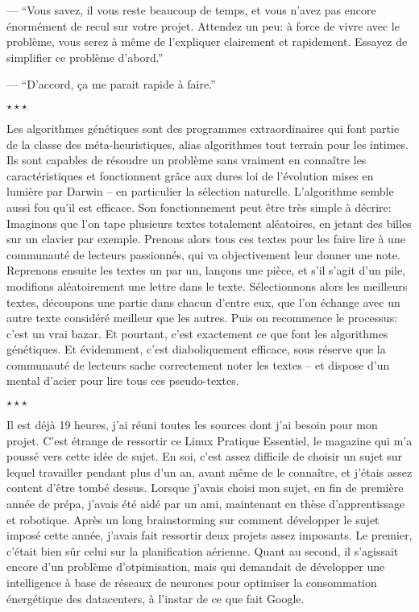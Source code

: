 \documentclass[letterpaper, 12pt]{article} %
\newcommand{\stardelimiter}{{\begin{center}\vspace{0.5cm} $\star \star \star$\vspace{0.58cm}\end{center}}}
\begin{document}
{--- ``Vous savez, il vous reste beaucoup de temps, et vous n'avez pas encore énormément de recul sur votre projet.
		Attendez un peu: à force de vivre avec le problème, vous serez à même de l'expliquer clairement et rapidement.
		Essayez de simplifier ce problème d'abord.''

--- ``D'accord, ça me parait rapide à faire.''

\stardelimiter{}

Les algorithmes génétiques sont des programmes extraordinaires qui font partie de la classe des méta-heuristiques, alias algorithmes tout terrain pour les intimes. 
Ils sont capables de résoudre un problème sans vraiment en connaître les caractéristiques et fonctionnent grâce aux dures loi de l'évolution mises en lumière par Darwin -- en particulier la sélection naturelle. 
L'algorithme semble aussi fou qu'il est efficace.
Son fonctionnement peut être très simple à décrire: 
Imaginons que l'on tape plusieurs textes totalement aléatoires, en jetant des billes sur un clavier par exemple.
Prenons alors tous ces textes pour les faire lire à une communauté de lecteurs passionnés, qui va objectivement leur donner une note.
Reprenons ensuite les textes un par un, lançons une pièce, et s'il s'agit d'un pile, modifions aléatoirement une lettre dans le texte.
Sélectionnons alors les meilleurs textes, découpons une partie dans chacun d'entre eux, que l'on échange avec un autre texte considéré meilleur que les autres.
Puis on recommence le processus: c'est un vrai bazar. 
Et pourtant, c'est exactement ce que font les algorithmes génétiques.
Et évidemment, c'est diaboliquement efficace, sous réserve que la communauté de lecteurs sache correctement noter les textes -- et dispose d'un mental d'acier pour lire tous ces pseudo-textes.

\stardelimiter{}

Il est déjà 19 heures, j'ai réuni toutes les sources dont j'ai besoin pour mon projet. 
C'est étrange de ressortir ce Linux Pratique Essentiel, le magazine qui m'a poussé vers cette idée de sujet. 
En soi, c'est assez difficile de choisir un sujet sur lequel travailler pendant plus d'un an, avant même de le connaître,
et j'étais assez content d'être tombé dessus.
Lorsque j'avais choisi mon sujet, en fin de première année de prépa, j'avais été aidé par un ami, maintenant en thèse d'apprentissage et robotique.
Après un long brainstorming sur comment développer le sujet imposé cette année, j'avais fait ressortir deux projets assez imposants.
Le premier, c'était bien sûr celui sur la planification aérienne. 
Quant au second, il s'agissait encore d'un problème d'otpimisation, mais qui demandait de développer une intelligence à base de réseaux de neurones pour optimiser la consommation énergétique des datacenters, à l'instar de ce que fait Google.

}
\end{document}
